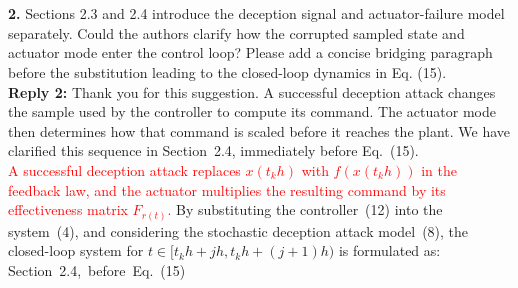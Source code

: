 \documentclass[10pt,fleqn]{article}
\begin{document}
%
%
% 	
% 	


~\\
\\
\textbf{2.} Sections 2.3 and 2.4 introduce the deception signal and actuator-failure model separately. Could the authors clarify how the corrupted sampled state and actuator mode enter the control loop? Please add a concise bridging paragraph before the substitution leading to the closed-loop dynamics in Eq. (15).
\\[10pt]
\indent \textbf{Reply 2:} Thank you for this suggestion. A successful deception attack changes the sample used by the controller to compute its command. The actuator mode then determines how that command is scaled before it reaches the plant. We have clarified this sequence in Section~2.4, immediately before Eq.~(15).\\[4pt]
\hspace*{\parindent}\textcolor{red}{A successful deception attack replaces $x(t_kh)$ with $f(x(t_kh))$ in the feedback law, and the actuator multiplies the resulting command by its effectiveness matrix $F_{r(t)}$.}
By substituting the controller~(12) into the system~(4), and considering the stochastic deception attack model~(8), the closed-loop system for $t \in [t_k h + jh, t_k h + (j+1)h)$ is formulated as: \mbox{Section~2.4, before Eq.~(15)}
\end{document}
